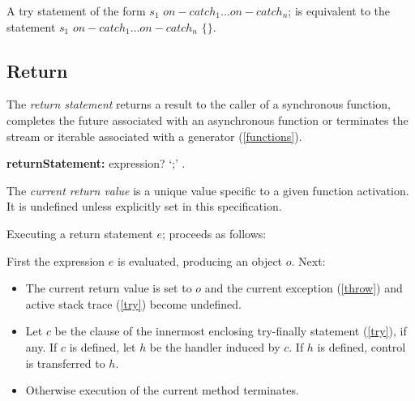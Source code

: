 \documentclass{article}
\newcommand{\code}[1]{{\sf #1}}
\begin{document}
\begin{itemize}
\LMHash{}
A try statement of the form \code{\TRY{} $s_1$ $on-catch_1 \ldots on-catch_n$;} is equivalent to the statement \code{\TRY{} $s_1$ $on-catch_1 \ldots on-catch_n$ \FINALLY{} $\{\}$}.


\subsection{ Return}

\LMHash{}
The {\em return statement} returns a result to the caller of a synchronous function,  completes the future associated with an asynchronous function or terminates the stream or iterable associated with a generator (\ref{functions}).


 \begin{grammar}
{\bf returnStatement:}
    \RETURN{} expression? `{\escapegrammar ;}' %
    .
 \end{grammar}


\LMHash{}
The {\em current return value} is a unique value specific to a given function activation. It is undefined unless explicitly set in this specification.

\LMHash{}
Executing a return statement \code{\RETURN{} $e$;} proceeds as follows:

\LMHash{}
First the expression $e$ is evaluated, producing an object $o$. Next:
\begin{itemize}
\item
The current return value is set to $o$ and the current exception (\ref{throw}) and active stack trace (\ref{try}) become undefined.
\item
Let $c$ be the \FINALLY{} clause of the innermost enclosing try-finally statement (\ref{try}), if any. If $c$ is defined, let $h$ be the handler induced by $c$. If $h$ is defined, control is transferred to $h$.
\item
Otherwise execution of the current method terminates.
\end{itemize}


\end{itemize}
\end{document}
